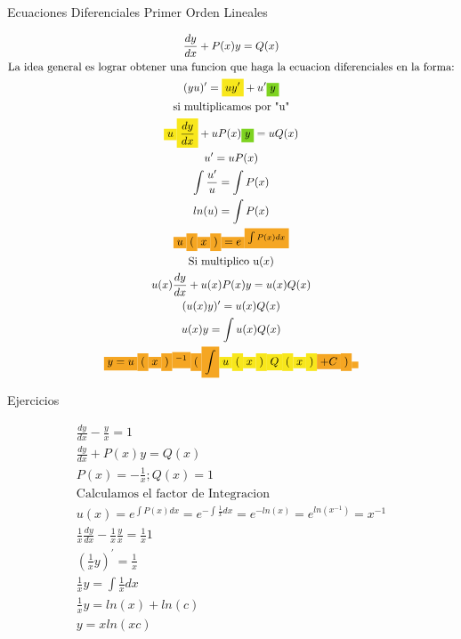 \documentclass{article}
\begin{document}
Ecuaciones Diferenciales Primer Orden Lineales


\begin{gather*}
\frac{dy}{dx} + P(x)y = Q(x) \\
\text{La idea general es lograr obtener una funcion que haga la ecuacion diferenciales en la forma:} \\
(yu)' = \text{\colorbox[RGB]{248,231,28}{$uy'$}} + u'\text{\colorbox[RGB]{126,211,33}{$y$}} \\
\text{si multiplicamos por "u"} \\
\text{\colorbox[RGB]{248,231,28}{$u$}}\text{\colorbox[RGB]{248,231,28}{$\frac{dy}{dx}$}} + uP(x)\text{\colorbox[RGB]{126,211,33}{$y$}}=uQ(x) \\
u' = uP(x) \\
\int \frac{u'}{u} =\int  P(x) \\
ln(u) = \int  P(x) \\
\text{\colorbox[RGB]{245,166,35}{$u$}}\text{\colorbox[RGB]{245,166,35}{$($}}\text{\colorbox[RGB]{245,166,35}{$x$}}\text{\colorbox[RGB]{245,166,35}{$)$}}\text{\colorbox[RGB]{245,166,35}{$ = e$}}\text{\colorbox[RGB]{245,166,35}{$^{\int P(x)dx}$}} \\
\text{Si multiplico u}(x) \\
u(x)\frac{dy}{dx} + u(x)P(x)y = u(x)Q(x) \\
(u(x)y)' = u(x)Q(x) \\
u(x)y = \int u(x)Q(x) \\
\text{\colorbox[RGB]{245,166,35}{$y =u$}}\text{\colorbox[RGB]{245,166,35}{$($}}\text{\colorbox[RGB]{245,166,35}{$x$}}\text{\colorbox[RGB]{245,166,35}{$)$}}\text{\colorbox[RGB]{245,166,35}{$^{-1}$}}\text{\colorbox[RGB]{245,166,35}{$($}}\text{\colorbox[RGB]{245,166,35}{$\int $}}\text{\colorbox[RGB]{248,231,28}{$u$}}\text{\colorbox[RGB]{248,231,28}{$($}}\text{\colorbox[RGB]{248,231,28}{$x$}}\text{\colorbox[RGB]{248,231,28}{$)$}}\text{\colorbox[RGB]{248,231,28}{$Q$}}\text{\colorbox[RGB]{248,231,28}{$($}}\text{\colorbox[RGB]{248,231,28}{$x$}}\text{\colorbox[RGB]{248,231,28}{$)$}}\text{\colorbox[RGB]{245,166,35}{$ +C$}}\text{\colorbox[RGB]{245,166,35}{$)$}}\text{\colorbox[RGB]{245,166,35}{$ $}}
\end{gather*}


Ejercicios


\begin{gather*}
\frac{dy}{dx}-\frac{y}{x} = 1 \\
\frac{dy}{dx}+P(x)y = Q(x) \\
P(x) = -\frac{1}{x} ;   Q(x)=1 \\
\text{Calculamos el factor de Integracion} \\
u(x) = e^{\int P(x)dx} =e^{-\int \frac{1}{x}dx}= e^{-ln(x)}=e^{ln(x^{-1})}=x^{-1} \\
\frac{1}{x}\frac{dy}{dx}-\frac{1}{x}\frac{y}{x} = \frac{1}{x}1 \\
(\frac{1}{x}y)^{'} = \frac{1}{x} \\
\frac{1}{x}y = \int \frac{1}{x}dx \\
\frac{1}{x}y = ln(x)+ln(c) \\
y = xln(xc)
\end{gather*}
\end{document}
